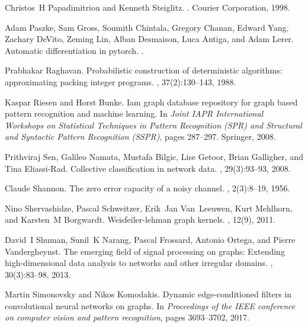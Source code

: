 \documentclass{article}
\begin{document}
\begin{thebibliography}{999}
	Christos~H Papadimitriou and Kenneth Steiglitz.
	.
	\newblock Courier Corporation, 1998.
	
	Adam Paszke, Sam Gross, Soumith Chintala, Gregory Chanan, Edward Yang, Zachary
	DeVito, Zeming Lin, Alban Desmaison, Luca Antiga, and Adam Lerer.
	\newblock Automatic differentiation in pytorch.
	.
	
	Prabhakar Raghavan.
	\newblock Probabilistic construction of deterministic algorithms: approximating
	packing integer programs.
	, 37(2):130--143, 1988.
	
	Kaspar Riesen and Horst Bunke.
	\newblock Iam graph database repository for graph based pattern recognition and
	machine learning.
	\newblock In {\em Joint IAPR International Workshops on Statistical Techniques
		in Pattern Recognition (SPR) and Structural and Syntactic Pattern Recognition
		(SSPR)}, pages 287--297. Springer, 2008.
	
	Prithviraj Sen, Galileo Namata, Mustafa Bilgic, Lise Getoor, Brian Galligher,
	and Tina Eliassi-Rad.
	\newblock Collective classification in network data.
	, 29(3):93--93, 2008.
	
	Claude Shannon.
	\newblock The zero error capacity of a noisy channel.
	, 2(3):8--19, 1956.
	
	Nino Shervashidze, Pascal Schweitzer, Erik~Jan Van~Leeuwen, Kurt Mehlhorn, and
	Karsten~M Borgwardt.
	\newblock Weisfeiler-lehman graph kernels.
	, 12(9), 2011.
	
	David~I Shuman, Sunil~K Narang, Pascal Frossard, Antonio Ortega, and Pierre
	Vandergheynst.
	\newblock The emerging field of signal processing on graphs: Extending
	high-dimensional data analysis to networks and other irregular domains.
	, 30(3):83--98, 2013.
	
	Martin Simonovsky and Nikos Komodakis.
	\newblock Dynamic edge-conditioned filters in convolutional neural networks on
	graphs.
	\newblock In {\em Proceedings of the IEEE conference on computer vision and
		pattern recognition}, pages 3693--3702, 2017.
	

\end{thebibliography}
\end{document}

